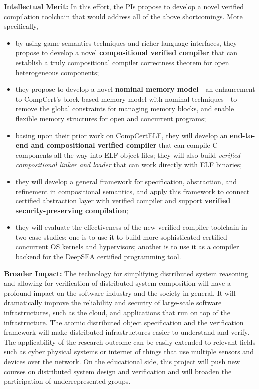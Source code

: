 {\bf Intellectual Merit:} In this effort, the PIs propose to
develop a novel verified compilation toolchain that would address
all of the above shortcomings. More specifically,
\begin{itemize}
\item by using game semantics techniques and richer language interfaces,
they propose to develop a novel {\bf compositional verified compiler} that
can establish a truly compositional compiler correctness theorem for
open heterogeneous components;
\item they propose to develop a novel {\bf nominal memory model}---an
enhancement to CompCert's block-based memory model with nominal
techniques---to remove the global constraints for managing memory
blocks, and enable flexible memory structures for open and concurrent
programs;
\item basing upon their prior work on CompCertELF, they will develop an
{\bf end-to-end and compositional verified
compiler} that can compile C components all the way into ELF
object files; they will also build {\em verified compositional linker
and loader} that can work directly with ELF binaries;
\item they will develop a general
framework for specification, abstraction, and refinement in
compositional semantics, and apply this framework to connect
certified abstraction layer with verified compiler and support
{\bf verified security-preserving compilation};
\item they will evaluate the effectiveness of the new verified compiler
toolchain in two case studies: one is to use it to build more sophisticated
certified concurrent OS kernels and hypervisors; another is to
use it as a compiler backend for the DeepSEA certified programming tool.
\end{itemize}

{\bf Broader Impact:} The technology for simplifying distributed
system reasoning and allowing for verification of distributed system
composition will have a profound impact on the software industry and
the society in general. It will dramatically improve the reliability
and security of large-scale software infrastructures, such as the
cloud, and applications that run on top of the infrastructure.  The
atomic distributed object specification and the verification framework
will make distributed infrastructures easier to understand and verify.
The applicability of the research outcome can be easily extended to
relevant fields such as cyber physical systems or internet of things
that use multiple sensors and devices over the network.  On the
educational side, this project will push new courses on distributed
system design and verification and will broaden the participation of
underrepresented groups.

